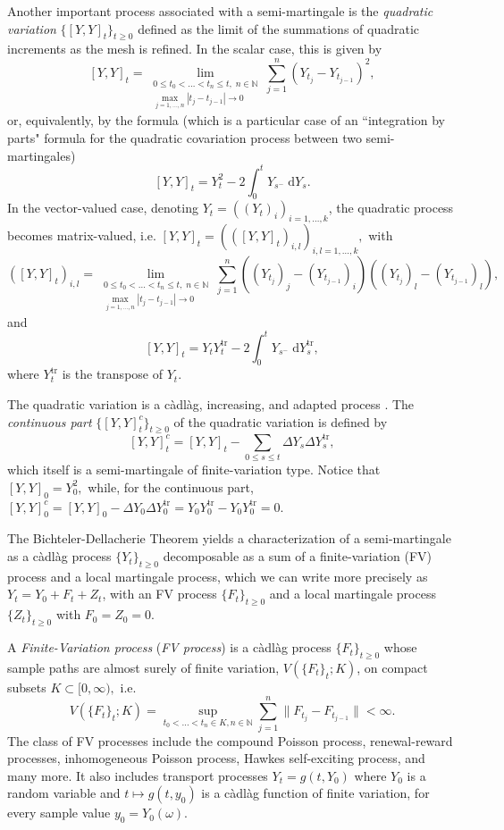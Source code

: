\documentclass[reqno,12pt]{amsart}
\theoremstyle{plain} %
\theoremstyle{definition} %
\newcommand{\tr}{{\operatorname{tr}}}
\begin{document}
Another important process associated with a semi-martingale is the \emph{quadratic variation} $\{[Y, Y]_t\}_{t\geq 0}$ defined as the limit of the summations of quadratic increments as the mesh is refined. In the scalar case, this is given by
\[
    [Y, Y]_t = \lim_{\substack{0\leq t_0 < \ldots < t_n \leq t, \;n\in \mathbb{N} \\ \max_{j=1, \ldots, n}|t_j - t_{j-1}| \rightarrow 0}} \sum_{j=1}^n (Y_{t_j} - Y_{t_{j-1}})^2,
\]
or, equivalently, by the formula (which is a particular case of an ``integration by parts" formula for the quadratic covariation process between two semi-martingales)
\[
    [Y, Y]_t = Y_t^2 - 2\int_0^t Y_{s^-} \;\mathrm{d}Y_s.
\]
In the vector-valued case, denoting $Y_t = ((Y_t)_i)_{i=1, \ldots, k}$, the quadratic process becomes matrix-valued, i.e. $[Y, Y]_t = (([Y, Y]_t)_{i,l})_{i,l=1,\ldots, k},$ with
\[
    ([Y, Y]_t)_{i,l} = \lim_{\substack{0\leq t_0 < \ldots < t_n \leq t, \;n\in \mathbb{N} \\ \max_{j=1, \ldots, n}|t_j - t_{j-1}| \rightarrow 0}} \sum_{j=1}^n ((Y_{t_j})_j - (Y_{t_{j-1}})_i) ((Y_{t_j})_l - (Y_{t_{j-1}})_l),
\]
and
\[
    [Y, Y]_t = Y_tY_t^\tr - 2\int_0^t Y_{s^-} \;\mathrm{d}Y_s^\tr,
\]
where $Y_t^\tr$ is the transpose of $Y_t.$

The quadratic variation is a c\`adl\`ag, increasing, and adapted process \cite[Theorem II.22]{Protter2005}. The \emph{continuous part} $\{[Y, Y]_t^c\}_{t\geq 0}$ of the quadratic variation is defined by
\[
    [Y, Y]_t^c = [Y, Y]_t - \sum_{0\leq s \leq t} \Delta Y_s\Delta Y_s^\tr,
\]
which itself is a semi-martingale of finite-variation type. Notice that $[Y, Y]_0 = Y_0^2,$ while, for the continuous part, $[Y, Y]_0^c = [Y, Y]_0 - \Delta Y_0\Delta Y_0^\tr = Y_0 Y_0^\tr - Y_0 Y_0^\tr = 0.$

The Bichteler-Dellacherie Theorem \cite[Theorem III.47]{Protter2005} yields a characterization of a semi-martingale as a c\`adl\`ag process $\{Y_t\}_{t\geq 0}$ decomposable as a sum of a finite-variation (FV) process and a local martingale process, which we can write more precisely as $Y_t = Y_0 + F_t + Z_t$, with an FV process $\{F_t\}_{t\geq 0}$ and a local martingale process $\{Z_t\}_{t\geq 0}$ with $F_0 = Z_0 = 0.$

A \emph{Finite-Variation process} (\emph{FV process}) is a c\`adl\`ag process $\{F_t\}_{t \geq 0}$ whose sample paths are almost surely of finite variation, $V(\{F_t\}_t; K)$, on compact subsets $K\subset [0, \infty),$ i.e.
\[ V(\{F_t\}_t; K) = \sup_{t_0 < \ldots < t_n \in K, n\in \mathbb{N}} \sum_{j=1}^n \|F_{t_j} - F_{t_{j-1}}\| < \infty.
\]
The class of FV processes include the compound Poisson process, renewal-reward processes, inhomogeneous Poisson process, Hawkes self-exciting process, and many more. It also includes transport processes $Y_t = g(t, Y_0)$ where $Y_0$ is a random variable and $t \mapsto g(t, y_0)$ is a c\`adl\`ag function of finite variation, for every sample value $y_0=Y_0(\omega)$.
\end{document}
